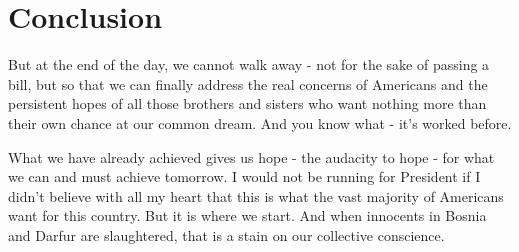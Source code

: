 \section{Conclusion}

But at the end of the day, we cannot walk away - not for the sake of passing a bill, but so that we can finally address the real concerns of Americans and the persistent hopes of all those brothers and sisters who want nothing more than their own chance at our common dream. And you know what - it's worked before.

What we have already achieved gives us hope - the audacity to hope - for what we can and must achieve tomorrow. I would not be running for President if I didn't believe with all my heart that this is what the vast majority of Americans want for this country. But it is where we start. And when innocents in Bosnia and Darfur are slaughtered, that is a stain on our collective conscience.
